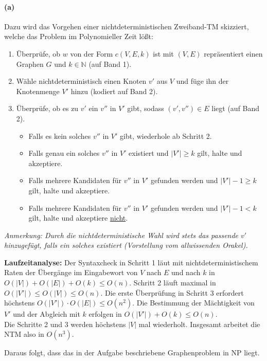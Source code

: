 
\paragraph{(a)}
	Dazu wird das Vorgehen einer nichtdeterministischen Zweiband-TM skizziert, welche das Problem im Polynomieller Zeit lößt:
	\begin{enumerate}
		\item Überprüfe, ob $w$ von der Form $c(V,E,k)$ ist mit $(V,E)$ repräsentiert einen Graphen $G$ und $k \in \mathbb{N}$ (auf Band 1).
		\item Wähle nichtdeterministisch einen Knoten $v'$ aus $V$ und füge ihn der Knotenmenge $V'$ hinzu (kodiert auf Band 2).
		\item Überprüfe, ob es zu $v'$ ein $v''$ in $V'$ gibt, sodass $(v',v'')\in E$ liegt (auf Band 2). \begin{itemize}
			\item Falls es kein solches $v''$ in $V'$ gibt, wiederhole ab Schritt 2.
			\item Falls genau ein solches $v''$ in $V'$ existiert und $|V'|\geq k$ gilt, halte und akzeptiere.
			\item Falls mehrere Kandidaten für $v''$ in $V'$ gefunden werden und $|V'|-1\geq k$ gilt, halte und akzeptiere.
			\item Falls mehrere Kandidaten für $v''$ in $V'$ gefunden werden und $|V'|-1 < k$ gilt, halte und akzeptiere \underline{nicht}.
		\end{itemize}
	\end{enumerate}
	\textit{Anmerkung: Durch die nichtdeterministische Wahl wird stets das passende $v'$ hinzugefügt, falls ein solches existiert (Vorstellung vom allwissenden Orakel).}

	\textbf{Laufzeitanalyse:} Der Syntaxcheck in Schritt 1 läut mit nichtdeterministischem Raten der Übergänge im Eingabewort von $V$ nach $E$ und nach $k$ in $O(|V|)+O(|E|)+O(k)\leq O(n)$. Schritt 2 läuft maximal in $O(|V'|)\leq O(|V|)\leq O(n)$. Die erste Überprüfung in Schritt 3 erfordert höchstens $O(|V'|)\cdot O(|E|)\leq O(n^2)$. Die Bestimmung der Mächtigkeit von $V'$ und der Abgleich mit $k$ erfolgen in $O(|V'|)+O(k)\leq O(n)$.\\
	Die Schritte 2 und 3 werden höchstens $|V|$ mal wiederholt. Insgesamt arbeitet die NTM also in $O(n^3)$.

	Daraus folgt, dass das in der Aufgabe beschriebene Graphenproblem in NP liegt.

